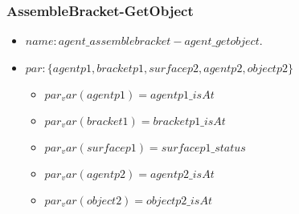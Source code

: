 \subsubsection{AssembleBracket-GetObject}
\begin{itemize}
	\item $name: agent\_assemblebracket-agent\_getobject$.
	\item		$par: \{agentp1,bracketp1,surfacep2,agentp2,objectp2\}$
		\begin{itemize}
			\item $par_var(agentp1)=agentp1\_isAt$
			\item $par_var(bracket1)=bracketp1\_isAt$
			\item $par_var(surfacep1)=surfacep1\_status$
			\item $par_var(agentp2)=agentp2\_isAt$
			\item $par_var(object2)=objectp2\_isAt$
		\end{itemize}


\end{itemize}
